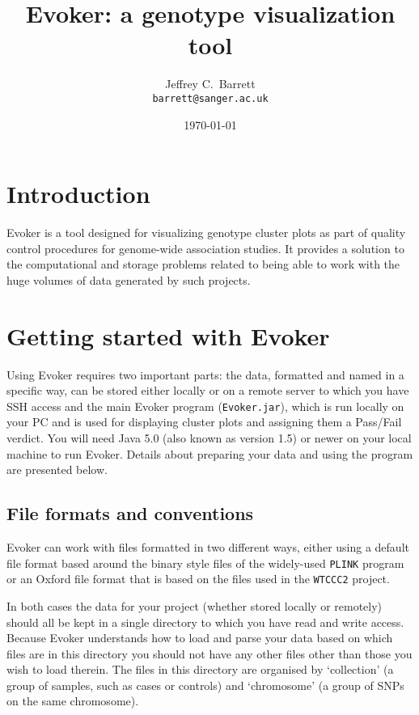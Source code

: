 \documentclass{article}
\title{Evoker: a genotype visualization tool}
\author{Jeffrey C.\ Barrett\\\texttt{barrett@sanger.ac.uk}}
\date{\today}
\begin{document}
\maketitle

\section{Introduction}

Evoker is a tool designed for visualizing genotype cluster plots as part of quality control procedures for genome-wide association studies. It provides a solution to the computational and storage problems related to being able to work with the huge volumes of data generated by such projects.

\section{Getting started with Evoker}

Using Evoker requires two important parts: the data, formatted and named in a specific way, can be stored either locally or on a remote server to which you have SSH access and the main Evoker program (\texttt{Evoker.jar}), which is run locally on your PC and is used for displaying cluster plots and assigning them a Pass/Fail verdict. You will need Java 5.0 (also known as version 1.5) or newer on your local machine to run Evoker. Details about preparing your data and using the program are presented below.

\subsection{File formats and conventions}

Evoker can work with files formatted in two different ways, either using a default file format based around the binary style files of the widely-used \texttt{PLINK} program or an Oxford file format that is based on the files used in the \texttt{WTCCC2} project. 

In both cases the data for your project (whether stored locally or remotely) should all be kept in a single directory to which you have read and write access. Because Evoker understands how to load and parse your data based on which files are in this directory you should not have any other files other than those you wish to load therein. The files in this directory are organised by `collection' (a group of samples, such as cases or controls) and `chromosome' (a group of SNPs on the same chromosome).
\end{document}
